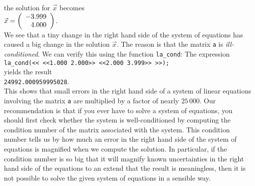 the solution for $\vec{x}$ becomes
\\[0.2cm]
\hspace*{1.3cm}
$\vec{x}  = 
 \left(
   \begin{array}[c]{r}
     -3.999 \\ 4.000
   \end{array}
  \right)
$.
\\[0.2cm]
We see that a tiny change in the right hand side of the system of equations has caused a big change
in the solution $\vec{x}$.  The reason is that the matrix \texttt{a} is \emph{ill-conditioned}.
We can verify this using the function \texttt{la\_cond}:  The expression
\\[0.2cm]
\hspace*{1.3cm}
\texttt{la\_cond(<< <<1.000 2.000>> <<2.000 3.999>> >>);}
\\[0.2cm]
yields the result 
\\[0.2cm]
\hspace*{1.3cm}
\texttt{24992.000959995028}.
\\[0.2cm]
This shows that small errors in the right hand side of a system of linear equations involving the
matrix \texttt{a} are multiplied by a factor of nearly $25\,000$.  Our recommendation is that if you
ever have to solve a system of equations, you should first check whether the system is
well-conditioned by computing the condition number of the matrix associated with the system.  This 
condition number tells us by how much an error in the right hand side of the system of equations is
magnified when we compute the solution.  In particular, if the condition number is so big that it
will magnify known uncertainties in  the right hand side of the equations to an extend that the
result is meaningless, then it is not possible to solve the given system of equations in a sensible
way. 


